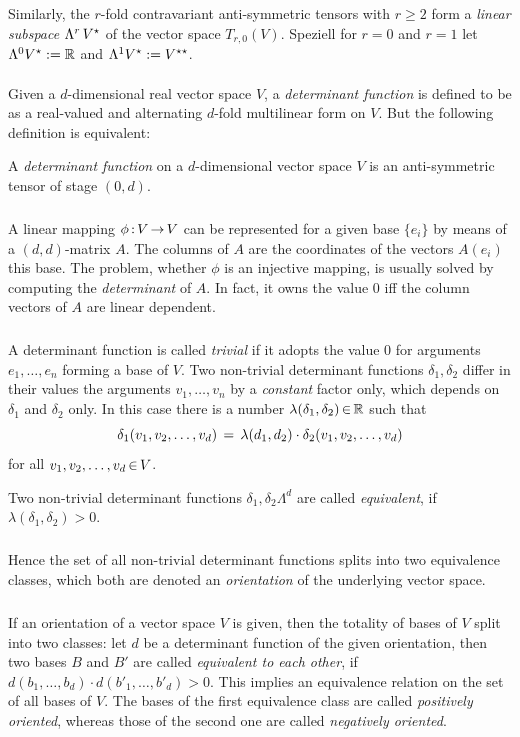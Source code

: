 \documentclass[11pt,twoside]{article}
\begin{document}
\subparagraph{}
Similarly,
the $r$-fold contravariant anti-symmetric tensors with
$r \geq 2$ form a \textit{linear subspace} $\Lambda^r \, V^\*$ of
the vector space $T_{r,0}(V)$. 
Speziell for $r=0$ and $r=1$ let
$\Lambda^0 V^\* := \R$ and $\Lambda^1 V^\* := V^{\*\*}$.

\paragraph{}
Given a $d$-dimensional real vector space $V$,
a \textit{determinant function} is defined to be as a real-valued
and alternating $d$-fold multilinear form on $V$. 
But the following definition is equivalent:

\begin{definition}
A \textit{determinant function} on a $d$-dimensional vector space $V$
is an anti-symmetric tensor of stage $(0,d)$.
\end{definition}

\subparagraph{}
A linear mapping $\phi \: V \xto V$ can be represented for a given base 
$\{e_i\}$ by means of a $(d,d)$-matrix $A$. 
The columns of $A$ are the coordinates of the vectors $A(e_i)$ {\wrt} this base.
The problem,
whether $\phi$ is an injective mapping,
is usually solved by computing the \textit{determinant} of $A$.
In fact, it owns the value $0$
iff
the column vectors of $A$ are linear dependent.

\subparagraph{}
A determinant function is called \textit{trivial}
if it adopts the value $0$ for arguments $e_1,\ldots,e_n$
forming a base of $V$.
Two non-trivial determinant functions $\delta_1, \delta_2$
differ in their values {\wrt} the arguments 
$v_1,\ldots,v_n$ by a \textit{constant} factor only, 
which depends on $\delta_1$ and $\delta_2$ only.
In this case there is a number $\lambda(\delta_1,\delta_2) \xeof \R$
such that
\[
\delta_1(v_1,v_2,\ldots,v_d) \= \lambda(d_1,d_2) \cdot
\delta_2(v_1,v_2,\ldots,v_d)
\]
for all $v_1,v_2,\ldots,v_d \xeof V$.

\begin{definition}
Two non-trivial determinant functions $\delta_1,\delta_2 \Lambda^d$
are called \textit{equivalent},
if $\lambda(\delta_1,\delta_2) > 0$.
\end{definition}

\subparagraph{}
Hence the set of all non-trivial determinant functions 
splits into two equivalence classes,
which both are denoted an \textit{orientation} of the underlying vector space.

\subparagraph{}
If an orientation of a vector space $V$ is given,
then the totality of bases of $V$ split into two classes: 
let $d$ be a determinant function of the given orientation,
then two bases $B$ and $B'$ are called \textit{equivalent to each other},
if
$d(b_1,\ldots,b_d) \cdot d(b'_1,\ldots,b'_d) > 0$.
This implies an equivalence relation on the set of all bases of $V$.
The bases of the first equivalence class
are called \textit{positively oriented},
whereas those of the second one are called \textit{negatively oriented}.
\end{document}
